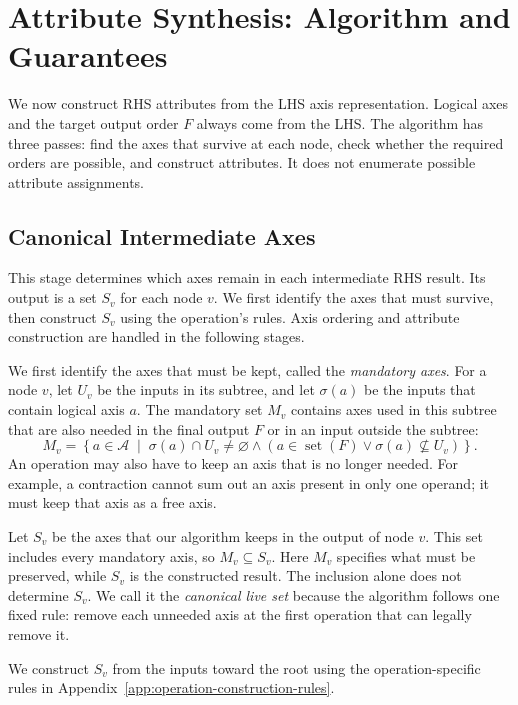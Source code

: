 \section{Attribute Synthesis: Algorithm and Guarantees}
\label{sec:mathematical-synthesis}
We now construct RHS attributes from the LHS axis representation. Logical
axes and the target output order $F$ always come from the LHS. The algorithm
has three passes: find the axes that survive at each node, check whether
the required orders are possible, and construct attributes. It does not
enumerate possible attribute assignments.

\subsection{Canonical Intermediate Axes}
\label{sec:canonical-axes}
This stage determines which axes remain in each intermediate RHS result.
Its output is a set $S_v$ for each node $v$. We first identify the axes that
must survive, then construct $S_v$ using the operation's rules. Axis ordering
and attribute construction are handled in the following stages.

We first identify the axes that must be kept, called the \emph{mandatory
axes}. For a node $v$, let $U_v$ be the inputs in its subtree, and let
$\sigma(a)$ be the inputs that contain logical axis $a$. The mandatory
set $M_v$ contains axes used in this subtree that are also needed in the
final output $F$ or in an input outside the subtree:
\begin{equation}
 M_v=\left\{a\in\mathcal A\;\middle|\;
 \sigma(a)\cap U_v\ne\varnothing
 \land (a\in\operatorname{set}(F)\lor\sigma(a)\nsubseteq U_v)
 \right\}.
 \label{eq:mandatory-axes}
\end{equation}
An operation may also have to keep an axis that is no longer needed.
For example, a contraction cannot sum out an axis present in only one
operand; it must keep that axis as a free axis.

Let $S_v$ be the axes that our algorithm keeps in the output of node
$v$.
This set includes every mandatory axis, so $M_v\subseteq S_v$.
Here $M_v$ specifies what must be preserved, while $S_v$ is the constructed
result. The inclusion alone does not determine $S_v$.
We call it the \emph{canonical live set} because the algorithm follows one
fixed rule: remove each unneeded axis at the first operation that can
legally remove it.

We construct $S_v$ from the inputs toward the root using the operation-specific
rules in Appendix~\ref{app:operation-construction-rules}.

